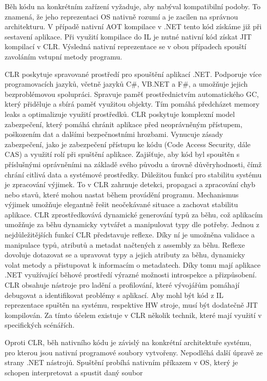 Běh kódu na konkrétním zařízení vyžaduje, aby nabýval kompatibilní podoby. To znamená, že jeho reprezentaci OS nativně rozumí a je zacílen na správnou architekturu. V případě nativní AOT kompilace v .NET tento kód získáme již při sestavení aplikace. Při využití kompilace do IL je nutné nativní kód získat JIT kompilací v CLR. Výsledná nativní reprezentace se v obou případech spouští zavoláním vstupní metody programu.

CLR poskytuje spravované prostředí pro spouštění aplikací .NET. Podporuje více programovacích jazyků, včetně jazyků C\#, VB.NET a F\#, a umožňuje jejich bezproblémovou spolupráci. Spravuje paměť prostřednictvím automatického GC, který přiděluje a sbírá paměť využitou objekty. \cite{Richter2012} Tím pomáhá předcházet memory leaks a optimalizuje využití prostředků. CLR poskytuje komplexní model zabezpečení, který pomáhá chránit aplikace před neoprávněným přístupem, poškozením dat a dalšími bezpečnostními hrozbami. Vynucuje zásady zabezpečení, jako je zabezpečení přístupu ke kódu (Code Access Security, dále CAS) a využití rolí při spuštění aplikace. \cite{Richter2012} Zajišťuje, aby kód byl spouštěn s příslušnými oprávněními na základě svého původu a úrovně důvěryhodnosti, čímž chrání citlivá data a systémové prostředky. Důležitou funkcí pro stabilitu systému je zpracování výjimek. To v CLR zahrnuje detekci, propagaci a zpracování chyb nebo stavů, které mohou nastat během provádění programu. Mechanismus výjimek umožňuje elegantně řešit neočekávané situace a zachovat stabilitu aplikace. CLR zprostředkovává dynamické generování typů za běhu, což aplikacím umožňuje za běhu dynamicky vytvářet a manipulovat typy dle potřeby. \cite{Richter2012} Jednou z nejdůležitějších funkcí CLR představuje reflexe. Díky ní je umožněna validace a manipulace typů, atributů a metadat načtených z assembly za běhu. Reflexe dovoluje dotazovat se a upravovat typy a jejich atributy za běhu, dynamicky volat metody a přistupovat k informacím o metadatech. Díky tomu mají aplikace .NET využívající běhové prostředí výrazné možnosti introspekce a přizpůsobení. CLR obsahuje nástroje pro ladění a profilování, které vývojářům pomáhají debugovat a identifikovat problémy s aplikací. Aby mohl být kód z IL reprezentace spuštěn na systému, respektive HW stroje, musí být dodatečně JIT kompilován. Za tímto účelem existuje v CLR několik technik, které mají využití v specifických scénářích.

Oproti CLR, běh nativního kódu je závislý na konkrétní architektuře systému, pro kterou jsou nativní programové soubory vytvořeny. Nepodléhá další úpravě ze strany .NET nástrojů. Spuštění probíhá nativním příkazem v OS, který je schopen interpretovat a spustit daný soubor

